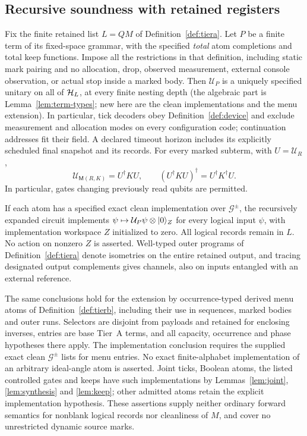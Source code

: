 
\subsection{Recursive soundness with retained registers}

\begin{theorem}\label{thm:sA-sound}
Fix the finite retained list $L=QM$ of Definition~\ref{def:tiera}.
Let $P$ be a finite term of its fixed-space grammar, with the specified
\emph{total} atom completions and total keep functions. Impose all the
restrictions in that definition, including static mark pairing and no
allocation, drop, observed measurement, external console observation, or
actual stop inside a marked body. Then $\mathcal U_P$ is a uniquely
specified unitary on all of $\mathcal{H}_L$, at every finite nesting depth
(the algebraic part is Lemma~\ref{lem:term-types}; new here are the clean
implementations and the menu extension).
In particular, tick decoders obey Definition~\ref{def:device} and
exclude measurement and allocation modes on every configuration code;
continuation addresses fit their field. A declared timeout horizon
includes its explicitly scheduled final snapshot and its records.
For every marked subterm, with $U=\mathcal U_R$,
\[
 \mathcal U_{\mathsf M(R,K)}=U^\dagger KU,
 \qquad (U^\dagger KU)^\dagger=U^\dagger K^\dagger U.
\]
In particular, gates changing previously read qubits are permitted.

If each atom has a specified exact clean implementation over
$\mathcal G^{\pm}$, the recursively expanded circuit implements
$\psi\mapsto\mathcal U_P\psi\otimes\lvert 0\rangle_Z$ for every logical input
$\psi$, with implementation workspace $Z$ initialized to zero. All
logical records remain in $L$. No action on nonzero $Z$ is asserted.
Well-typed outer programs of Definition~\ref{def:tiera} denote isometries
on the entire retained output, and tracing designated output complements
gives channels, also on inputs entangled with an external reference.

The same conclusions hold for the extension by occurrence-typed derived
menu atoms of Definition~\ref{def:tierb}, including their use in
sequences, marked bodies and outer runs. Selectors are disjoint from
payloads and retained for enclosing inverses, entries are base Tier~A
terms, and all capacity, occurrence and phase hypotheses there apply.
The implementation conclusion requires the supplied exact clean
$\mathcal G^{\pm}$ lists for menu entries. No exact finite-alphabet
implementation of an arbitrary ideal-angle atom is asserted. Joint
ticks, Boolean atoms, the listed controlled gates and keeps have such
implementations by Lemmas~\ref{lem:joint}, \ref{lem:synthesis}
and \ref{lem:keep}; other admitted atoms retain the explicit
implementation hypothesis. These assertions
supply neither ordinary forward semantics for nonblank logical records
nor cleanliness of $M$, and cover no unrestricted dynamic source marks.
\end{theorem}
